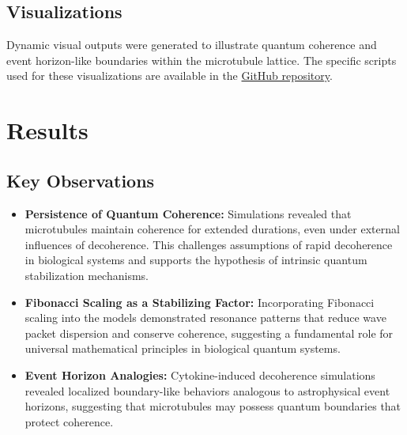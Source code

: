 \documentclass[entropy,article,submit,oneauthor,pdftex]{Definitions/mdpi}
\begin{document}
\subsection{Visualizations}
Dynamic visual outputs were generated to illustrate quantum coherence and event horizon-like boundaries within the microtubule lattice. The specific scripts used for these visualizations are available in the \href{https://github.com/TheonlyqueenAC/Microtubule_Simulation}{GitHub repository}.

\section{Results}
\subsection{Key Observations}
\begin{itemize}
    \item \textbf{Persistence of Quantum Coherence:} Simulations revealed that microtubules maintain coherence for extended durations, even under external influences of decoherence. This challenges assumptions of rapid decoherence in biological systems and supports the hypothesis of intrinsic quantum stabilization mechanisms.
    \item \textbf{Fibonacci Scaling as a Stabilizing Factor:} Incorporating Fibonacci scaling into the models demonstrated resonance patterns that reduce wave packet dispersion and conserve coherence, suggesting a fundamental role for universal mathematical principles in biological quantum systems.
    \item \textbf{Event Horizon Analogies:} Cytokine-induced decoherence simulations revealed localized boundary-like behaviors analogous to astrophysical event horizons, suggesting that microtubules may possess quantum boundaries that protect coherence.
\end{itemize}
\end{document}

